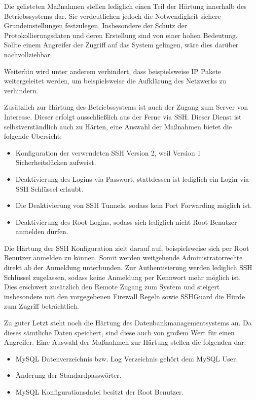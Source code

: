 Die gelisteten Maßnahmen stellen lediglich einen Teil der Härtung innerhalb des Betriebssystems dar. Sie verdeutlichen jedoch die Notwendigkeit sichere Grundeinstellungen festzulegen. Insbesondere der Schutz der Protokollierungsdaten und deren Erstellung sind von einer hohen Bedeutung. Sollte einem Angreifer der Zugriff auf das System gelingen, wäre dies darüber nachvollziehbar.

Weiterhin wird unter anderem verhindert, dass beispielsweise \ac{IP} Pakete weitergeleitet werden, um beispielsweise die Aufklärung des Netzwerks zu verhindern.

Zusätzlich zur Härtung des Betriebssystems ist auch der Zugang zum Server von Interesse. Dieser erfolgt ausschließlich aus der Ferne via \ac{SSH}. Dieser Dienst ist selbstverständlich auch zu Härten, eine Auswahl der Maßnahmen bietet die folgende Übersicht:

\begin{itemize}
	\item Konfiguration der verwendeten SSH Version 2, weil Version 1 Sicherheitslücken aufweist.
	\item Deaktivierung des Logins via Passwort, stattdessen ist lediglich ein Login via SSH Schlüssel erlaubt.
	\item Die Deaktivierung von SSH Tunnels, sodass kein Port Forwarding möglich ist.
	\item Deaktivierung des Root Logins, sodass sich lediglich nicht Root Benutzer anmelden dürfen.
\end{itemize}

Die Härtung der SSH Konfiguration zielt darauf auf, beispielsweise sich per Root Benutzer anmelden zu können. Somit werden weitgehende Administratorrechte direkt ab der Anmeldung unterbunden. Zur Authentisierung werden lediglich \ac{SSH} Schlüssel zugelassen, sodass keine Anmeldung per Kennwort mehr möglich ist. Dies erschwert zusätzlich den Remote Zugang zum System und steigert insbesondere mit den vorgegebenen Firewall Regeln sowie SSHGuard die Hürde zum Zugriff beträchtlich.

Zu guter Letzt steht noch die Härtung des Datenbankmanagementsystems an. Da dieses sämtliche Daten speichert, sind diese auch von großem Wert für einen Angreifer. Eine Auswahl der Maßnahmen zur Härtung stellen die folgenden dar:

\begin{itemize}
	\item MySQL Datenverzeichnis bzw. Log Verzeichnis gehört dem MySQL User.
	\item Änderung der Standardpasswörter.
	\item MySQL Konfigurationsdatei besitzt der Root Benutzer.
\end{itemize}

